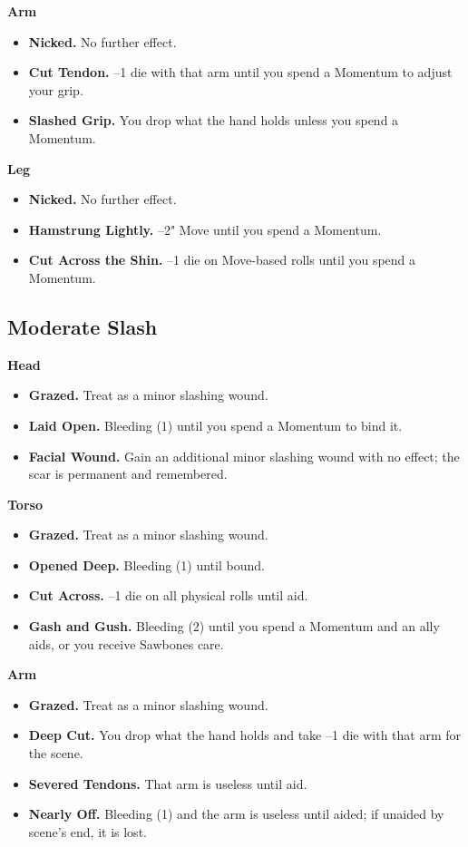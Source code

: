 \textbf{Arm}
\begin{itemize}
    \item[1--2] \textbf{Nicked.} No further effect.
    \item[3] \textbf{Cut Tendon.} --1 die with that arm until you spend a Momentum to adjust your grip.
    \item[4] \textbf{Slashed Grip.} You drop what the hand holds unless you spend a Momentum.
\end{itemize}

\textbf{Leg}
\begin{itemize}
    \item[1--2] \textbf{Nicked.} No further effect.
    \item[3] \textbf{Hamstrung Lightly.} --2" Move until you spend a Momentum.
    \item[4] \textbf{Cut Across the Shin.} --1 die on Move-based rolls until you spend a Momentum.
\end{itemize}

\subsection{Moderate Slash}

\textbf{Head}
\begin{itemize}
    \item[1] \textbf{Grazed.} Treat as a minor slashing wound.
    \item[2] \textbf{Laid Open.} Bleeding (1) until you spend a Momentum to bind it.
    \item[3--4] \textbf{Facial Wound.} Gain an additional minor slashing wound with no effect; the scar is permanent and remembered.
\end{itemize}

\textbf{Torso}
\begin{itemize}
    \item[1] \textbf{Grazed.} Treat as a minor slashing wound.
    \item[2] \textbf{Opened Deep.} Bleeding (1) until bound.
    \item[3] \textbf{Cut Across.} --1 die on all physical rolls until aid.
    \item[4] \textbf{Gash and Gush.} Bleeding (2) until you spend a Momentum and an ally aids, or you receive Sawbones care.
\end{itemize}

\textbf{Arm}
\begin{itemize}
    \item[1] \textbf{Grazed.} Treat as a minor slashing wound.
    \item[2] \textbf{Deep Cut.} You drop what the hand holds and take --1 die with that arm for the scene.
    \item[3] \textbf{Severed Tendons.} That arm is useless until aid.
    \item[4] \textbf{Nearly Off.} Bleeding (1) and the arm is useless until aided; if unaided by scene's end, it is lost.
\end{itemize}

